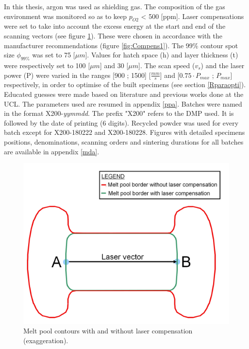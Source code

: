 In this thesis, argon was used as shielding gas. The composition of the gas environment was monitored so as to keep $p_{O2}$ < 500 [ppm]. Laser compensations were set to take into account the excess energy at the start and end of the scanning vectors (see figure \ref{fig:Compens}). These were chosen in accordance with the manufacturer recommendations (figure \ref{fig:Compens1}). The 99\% contour spot size $\phi_{99\%}$ was set to 75 [$\mu m$]. Values for hatch space (h) and layer thickness (t) were respectively set to 100 [$\mu m$] and 30 [$\mu m$]. The scan speed ($v_s$) and the laser power (P) were varied in the ranges [900 ; 1500] [$\frac{mm}{s}$] and [$0.75 \cdot P_{max}$ ; $P_{max}$] respectively, in order to optimise of the built specimens (see section \ref{Rparaopti}). Educated guesses were made based on literature and previous works done at the UCL. The parameters used are resumed in appendix \ref{ppa}. Batches were named in the format X200-\textit{yymmdd}. The prefix "X200" refers to the DMP used. It is followed by the date of printing (6 digits). Recycled powder was used for every batch except for X200-180222 and X200-180228. Figures with detailed specimens positions, denominations, scanning orders and sintering durations for all batches are available in appendix \ref{mda}.\\

\begin{figure}[ht]
\centering
\includegraphics[scale=0.3]{Images/Compens}
\decoRule
\caption[Melt pool contours with and without laser compensation (exaggeration)]{Melt pool contours with and without laser compensation (exaggeration).}
\label{fig:Compens}
\end{figure}

